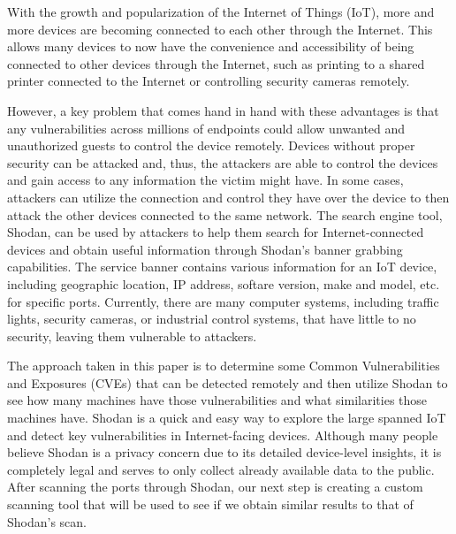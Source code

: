 With the growth and popularization of the Internet of Things (IoT),
more and more devices are becoming connected to each other through the Internet. 
This allows many devices to now have the convenience and accessibility of being 
connected to other devices through the Internet, such as printing to a
shared printer connected to the Internet or controlling security cameras
remotely.

However, a key problem that comes hand in hand with these advantages is that
any vulnerabilities across millions of endpoints could allow unwanted and
unauthorized guests to control the device remotely. Devices without proper
security can be attacked and, thus, the attackers are able to control the 
devices and gain access to any information the victim might have. In some cases,
attackers can utilize the connection and control they have over the device to then 
attack the other devices connected to the same network. The search engine tool, Shodan, can
be used by attackers to help them search for Internet-connected devices and obtain
useful information through Shodan's banner grabbing capabilities. The service banner
contains various information for an IoT device, including geographic location, 
IP address, softare version, make and model, etc. for specific ports. 
Currently, there are many computer systems, including traffic lights, security cameras,
or industrial control systems, that have little to no security, leaving them vulnerable to attackers\cite{afit//CSAR-10-025-01}.

The approach taken in this paper is to determine some Common Vulnerabilities
and Exposures (CVEs) that can be detected remotely and then utilize Shodan
to see how many machines have those vulnerabilities and what similarities
those machines have. Shodan is a quick and easy way to explore the large
spanned IoT and detect key vulnerabilities in Internet-facing devices.
Although many people believe Shodan is a privacy concern due to its detailed
device-level insights, it is completely legal and serves to only collect
already available data to the public. After scanning the ports through Shodan,
our next step is creating a custom scanning tool that will be used to see if we obtain
similar results to that of Shodan's scan. 

